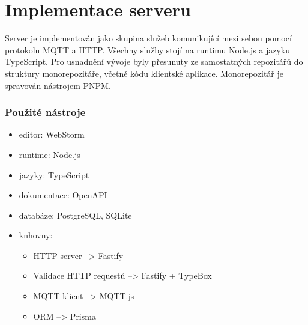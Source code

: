 \section{Implementace serveru}
Server je implementován jako skupina služeb komunikující mezi sebou pomocí protokolu MQTT a HTTP. Všechny služby stojí na runtimu Node.js a jazyku TypeScript. Pro usnadnění vývoje byly přesunuty ze samostatných repozitářů do struktury monorepozitáře, včetně kódu klientské aplikace. Monorepozitář je spravován nástrojem PNPM.

\subsubsection{Použité nástroje}
\begin{itemize}
    \item editor: WebStorm
    \item runtime: Node.js
    \item jazyky: TypeScript
    \item dokumentace: OpenAPI
    \item databáze: PostgreSQL, SQLite
    \item knhovny:
        \begin{itemize}
            \item HTTP server --> Fastify\cite{FastifyFastify2024}
            \item Validace HTTP requestů --> Fastify + TypeBox\cite{sinclairzx81Sinclairzx81Typebox2024}
            \item MQTT klient --> MQTT.js\cite{MqttjsMQTTJs}
            \item ORM --> Prisma\cite{PrismaPrisma2024}
        \end{itemize}
\end{itemize}

